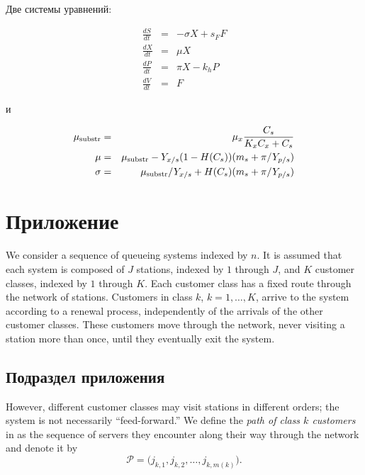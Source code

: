 \documentclass[final,pdftex]{epsilonj}
\numberwithin{equation}{section}
\begin{document}
Две системы уравнений:

\begin{eqnarray}
  \frac{dS}{dt} & = & - \sigma X + s_{F} F\\
  \frac{dX}{dt} & = &   \mu    X\\
  \frac{dP}{dt} & = &   \pi    X - k_{h} P\\
  \frac{dV}{dt} & = &   F
\end{eqnarray}

и

\begin{eqnarray}
 \mu_{\rm substr} & = & \mu_{x} \frac{C_{s}}{K_{x}C_{x}+C_{s}}  \\
 \mu              & = & \mu_{\rm substr} - Y_{x/s}(1-H(C_{s}))(m_{s}+\pi /Y_{p/s}) \\
 \sigma           & = & \mu_{\rm substr}/Y_{x/s}+ H(C_{s}) (m_{s}+ \pi /Y_{p/s})
\end{eqnarray}

\printbibliography

\appendix

\section{Приложение}
\label{pril}

We consider a sequence of queueing systems
indexed by $n$.  It is assumed that each system
is composed of $J$ stations, indexed by $1$
through $J$, and $K$ customer classes, indexed
by $1$ through $K$.  Each customer class
has a fixed route through the network of
stations.  Customers in class
$k$, $k=1,\ldots,K$, arrive to the
system according to a
renewal process, independently of the arrivals
of the other customer classes.  These customers
move through the network, never visiting a station
more than once, until they eventually exit
the system.


\subsection{Подраздел приложения}

However, different customer classes may visit
stations in different orders; the system
is not necessarily ``feed-forward.''
We define the {\em path of class $k$ customers} in
as the sequence of servers
they encounter along their way through the network
and denote it by
\begin{equation}
\mathcal{P}=\bigl(j_{k,1},j_{k,2},\dots,j_{k,m(k)}\bigr). \label{eq:path}
\end{equation}
\end{document}

